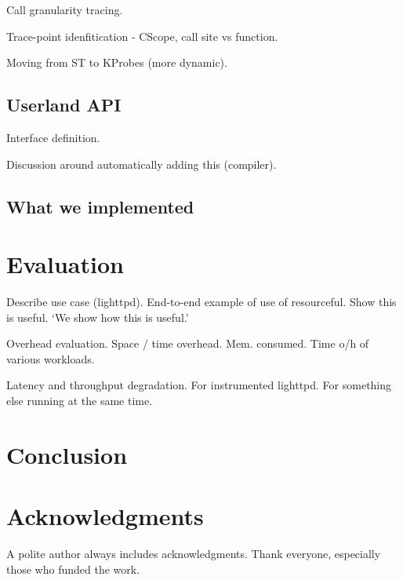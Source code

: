 \documentclass[letterpaper,twocolumn,10pt]{article}
\begin{document}
Call granularity tracing.

Trace-point idenfitication - CScope, call site vs function.

Moving from ST to KProbes (more dynamic).

\subsection{Userland API}
Interface definition.

Discussion around automatically adding this (compiler).

\subsection{What we implemented}


\section{Evaluation}
Describe use case (lighttpd).\newline
End-to-end example of use of resourceful. Show this is useful. `We show how this
is useful.'

Overhead evaluation.\newline
Space / time overhead. Mem. consumed. Time o/h of various workloads.

Latency and throughput degradation.\newline
For instrumented lighttpd. For something else running at the same time.


\section{Conclusion}

\section{Acknowledgments}

A polite author always includes acknowledgments.  Thank everyone,
especially those who funded the work.



{\footnotesize 
}
\end{document}
